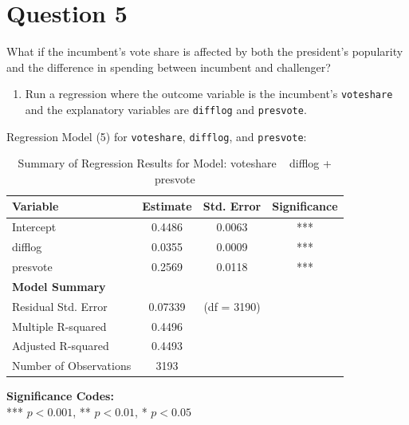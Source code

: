 \documentclass[12pt,letterpaper]{article}
\begin{document}
\section*{Question 5}
\noindent What if the incumbent's vote share is affected by both the president's popularity and the difference in spending between incumbent and challenger? 
\noindent\begin{enumerate}[left=0pt]
\item Run a regression where the outcome variable is the incumbent's \texttt{voteshare} and the explanatory variables are \texttt{difflog} and \texttt{presvote}.
\end{enumerate}
\noindent Regression Model (5) for \texttt{voteshare}, \texttt{difflog}, and \texttt{presvote}: 
\noindent

\begin{table}[h!]
	\centering
	\caption{Summary of Regression Results for Model: voteshare ~ difflog + presvote}
	\vspace{0.25cm}
	\begin{tabular}{lccc}
		\toprule
		\textbf{Variable} & \textbf{Estimate} & \textbf{Std. Error} & \textbf{Significance} \\ 
		\midrule
		Intercept              & 0.4486 & 0.0063 & *** \\ 
		difflog                & 0.0355 & 0.0009 & *** \\ 
		presvote               & 0.2569 & 0.0118 & *** \\ 
		\midrule
		\textbf{Model Summary} & & & \\
		Residual Std. Error    & 0.07339  & (df = 3190) & \\ 
		Multiple R-squared     & 0.4496   & & \\ 
		Adjusted R-squared     & 0.4493   & & \\ 
		Number of Observations & 3193     & & \\ 
		\bottomrule
	\end{tabular}
\end{table}

\vspace{0.1cm}
\noindent\textbf{Significance Codes:} \\
*** $p < 0.001$, ** $p < 0.01$, * $p < 0.05$
\end{document}
